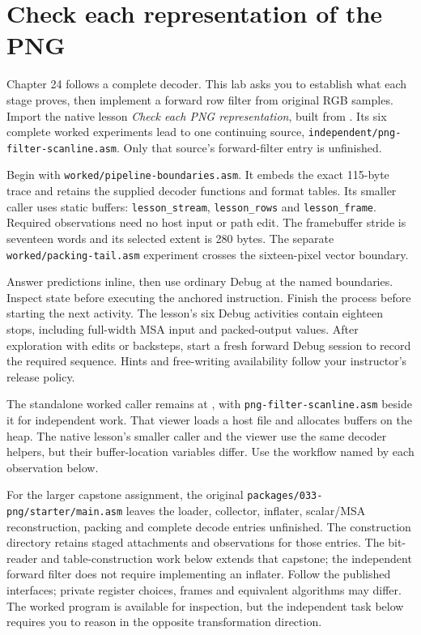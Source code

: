 \chapter{Check each representation of the PNG}
\label{revision-lab:png}

Chapter 24 follows a complete decoder. This lab asks you to establish what each
stage proves, then implement a forward row filter from original RGB samples.
Import the native lesson \emph{Check each PNG representation}, built from
. Its six complete worked experiments lead to one
continuing source, \texttt{independent/png-filter-scanline.asm}. Only that
source's forward-filter entry is unfinished.

Begin with \texttt{worked/pipeline-boundaries.asm}. It embeds the exact
115-byte trace and retains the supplied decoder functions and format tables.
Its smaller caller uses static buffers: \texttt{lesson\_stream},
\texttt{lesson\_rows} and \texttt{lesson\_frame}. Required observations need
no host input or path edit. The framebuffer stride is seventeen words and its
selected extent is 280 bytes. The separate \texttt{worked/packing-tail.asm}
experiment crosses the sixteen-pixel vector boundary.

Answer predictions inline, then use ordinary Debug at the named boundaries.
Inspect state before executing the anchored instruction. Finish the process
before starting the next activity. The lesson's six Debug activities contain
eighteen stops, including full-width MSA input and packed-output values.
After exploration with edits or backsteps, start a fresh forward Debug session
to record the required sequence. Hints and free-writing availability follow
your instructor's release policy.

The standalone worked caller remains at
, with
\texttt{png-filter-scanline.asm} beside it for independent work. That viewer
loads a host file and allocates buffers on the heap. The native lesson's smaller
caller and the viewer use the same decoder helpers, but their buffer-location
variables differ. Use the workflow named by each observation below.

For the larger capstone assignment, the original
\texttt{packages/033-png/starter/main.asm} leaves the loader, collector, inflater,
scalar/MSA reconstruction, packing and complete decode entries unfinished.
The construction directory retains staged attachments and observations for
those entries. The bit-reader and table-construction work below extends that
capstone; the independent forward filter does not require implementing an inflater. Follow the published interfaces; private register choices,
frames and equivalent algorithms may differ. The worked program is available
for inspection, but the independent task below requires you to reason in the
opposite transformation direction.

